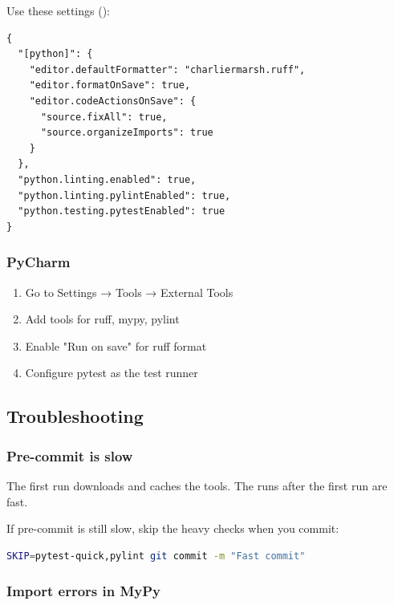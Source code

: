 Use these settings ():

\begin{lstlisting}[language={}]
{
  "[python]": {
    "editor.defaultFormatter": "charliermarsh.ruff",
    "editor.formatOnSave": true,
    "editor.codeActionsOnSave": {
      "source.fixAll": true,
      "source.organizeImports": true
    }
  },
  "python.linting.enabled": true,
  "python.linting.pylintEnabled": true,
  "python.testing.pytestEnabled": true
}
\end{lstlisting}

\subsubsection{PyCharm}\label{um:guide:local-qa:pycharm}

\begin{enumerate}
\def\labelenumi{\arabic{enumi}.}
\tightlist
\item
  Go to Settings → Tools → External Tools
\item
  Add tools for ruff, mypy, pylint
\item
  Enable "Run on save" for ruff format
\item
  Configure pytest as the test runner
\end{enumerate}

\subsection{Troubleshooting}\label{um:guide:local-qa:troubleshooting}

\subsubsection{Pre-commit is slow}\label{um:guide:local-qa:pre-commit-is-slow}

The first run downloads and caches the tools.
The runs after the first run are fast.

If pre-commit is still slow, skip the heavy checks when you commit:

\begin{lstlisting}[language=bash]
SKIP=pytest-quick,pylint git commit -m "Fast commit"
\end{lstlisting}

\subsubsection{Import errors in MyPy}\label{um:guide:local-qa:import-errors-in-mypy}

